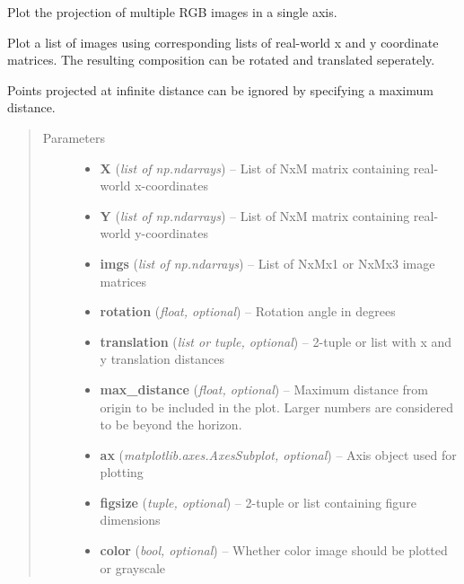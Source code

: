 \documentclass[letterpaper,10pt,english]{sphinxmanual}
\begin{document}
\begin{fulllineitems}
\label{rectification:flamingo.rectification.plot.plot_rectified}
Plot the projection of multiple RGB images in a single axis.

Plot a list of images using corresponding lists of real-world
x and y coordinate matrices. The resulting composition can be
rotated and translated seperately.

Points projected at infinite distance can be ignored by
specifying a maximum distance.
\begin{quote}\begin{description}
\item[{Parameters}] \leavevmode\begin{itemize}
\item {} 
\textbf{X} (\emph{list of np.ndarrays}) -- List of NxM matrix containing real-world x-coordinates

\item {} 
\textbf{Y} (\emph{list of np.ndarrays}) -- List of NxM matrix containing real-world y-coordinates

\item {} 
\textbf{imgs} (\emph{list of np.ndarrays}) -- List of NxMx1 or NxMx3 image matrices

\item {} 
\textbf{rotation} (\emph{float, optional}) -- Rotation angle in degrees

\item {} 
\textbf{translation} (\emph{list or tuple, optional}) -- 2-tuple or list with x and y translation distances

\item {} 
\textbf{max\_distance} (\emph{float, optional}) -- Maximum distance from origin to be included in the plot.
Larger numbers are considered to be beyond the horizon.

\item {} 
\textbf{ax} (\emph{matplotlib.axes.AxesSubplot, optional}) -- Axis object used for plotting

\item {} 
\textbf{figsize} (\emph{tuple, optional}) -- 2-tuple or list containing figure dimensions

\item {} 
\textbf{color} (\emph{bool, optional}) -- Whether color image should be plotted or grayscale


\end{itemize}
\end{description}
\end{quote}
\end{fulllineitems}
\end{document}
